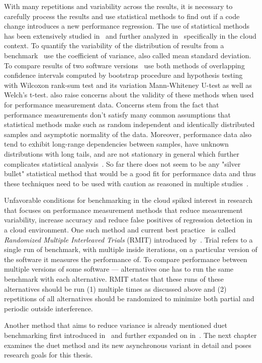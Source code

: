 With many repetitions and variability across the results, it is necessary to carefully process the results and use statistical methods to find out if a code change introduces a new performance regression.
The use of statistical methods has been extensively studied in~\citet{bulej2017stat} and further analyzed in~\citet{laaber2019software} specifically in the cloud context.
To quantify the variability of the distribution of results from a benchmark~\citet{laaber2019software} use the coefficient of variance, also called mean standard deviation.
To compare results of two software versions~\citet{bulej2017stat} use both methods of overlapping confidence intervals computed by bootstrap procedure and hypothesis testing with Wilcoxon rank-sum test and its variation Mann-Whiteney U-test as well as Welch's t-test.
\citet{bulej2017stat} also raise concerns about the validity of these methods when used for performance measurement data.
Concerns stem from the fact that performance measurements don't satisfy many common assumptions that statistical methods make such as random independent and identically distributed samples and asymptotic normality of the data.
Moreover, performance data also tend to exhibit long-range dependencies between samples, have unknown distributions with long tails, and are not stationary in general which further complicates statistical analysis~\cite{bulej2017stat}.
So far there does not seem to be any "silver bullet" statistical method that would be a good fit for performance data and thus these techniques need to be used with caution as reasoned in multiple studies~\cite{leitner2016patterns, laaber2019software, bulej2017stat}.

Unfavorable conditions for benchmarking in the cloud spiked interest in research that focuses on performance measurement methods that reduce measurement variability, increase accuracy and reduce false positives of regression detection in a cloud environment.
One such method and current best practice~\cite{laaber2019software} is called \emph{Randomized Multiple Interleaved Trials} (RMIT) introduced by~\citet{abedi2017conducting}.
Trial refers to a single run of benchmark, with multiple inside iterations, on a particular version of the software it measures the performance of.
To compare performance between multiple versions of some software --- alternatives one has to run the same benchmark with each alternative.
RMIT states that these runs of these alternatives should be run (1) multiple times as discussed above and (2) repetitions of all alternatives should be randomized to minimize both partial and periodic outside interference.

Another method that aims to reduce variance is already mentioned duet benchmarking first introduced in~\citet{bulej2019initial} and further expanded on in~\citet{bulej2020duet}.
The next chapter examines the duet method and its new asynchronous variant in detail and poses research goals for this thesis.

